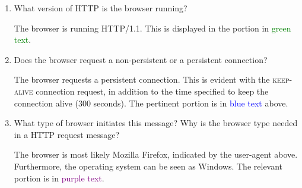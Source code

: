\begin{enumerate}
\begin{enumerate}
      \item What version of HTTP is the browser running?

        The browser is running HTTP/1.1. This is displayed in the portion in \textcolor{green}{green text}.

      \item Does the browser request a non-persistent or a persistent connection?

        The browser requests a persistent connection. This is evident with the \textsc{keep-alive} connection request, in addition to the time specified to keep the connection alive (300 seconds). The pertinent portion is in \textcolor{blue}{blue text} above.

      \item What type of browser initiates this message? Why is the browser type needed in a HTTP request message?

        The browser is most likely Mozilla Firefox, indicated by the user-agent above. Furthermore, the operating system can be seen as Windows. The relevant portion is in \textcolor{purple}{purple text}.

    \end{enumerate}
    
\end{enumerate}



